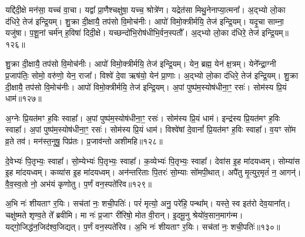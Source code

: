 यद्दि॑दी॒क्षे मन॑सा॒ यच्च॑ वा॒चा।
यद्वा᳚ प्रा॒णैश्चक्षु॑षा॒ यच्च॒ श्रोत्रे॑ण।
यद्रेत॑सा मिथु॒नेनाप्या॒त्मना᳚।
अ॒द्भ्यो लो॒का द॑धिरे॒ तेज॑ इन्द्रि॒यम्।
शु॒क्रा दी॒क्षायै॒ तप॑सो वि॒मोच॑नीः।
आपो॑ विमो॒क्त्रीर्मयि॒ तेज॑ इन्द्रि॒यम्।
यदृ॒चा साम्ना॒ यजु॑षा।
प॒शू॒नां चर्म॑न् ह॒विषा॑ दिदी॒क्षे।
यच्छन्दो॑भि॒रोष॑धीभि॒र्वन॒स्पतौ᳚।
अ॒द्भ्यो लो॒का द॑धिरे॒ तेज॑ इन्द्रि॒यम्॥१२६॥\ip

शु॒क्रा दी॒क्षायै॒ तप॑सो वि॒मोच॑नीः।
आपो॑ विमो॒क्त्रीर्मयि॒ तेज॑ इन्द्रि॒यम्।
येन॒ ब्रह्म॒ येन॑ क्ष॒त्रम्।
येने᳚न्द्रा॒ग्नी प्र॒जा\-प॑तिः॒ सोमो॒ वरु॑णो॒ येन॒ राजा᳚।
विश्वे॑ दे॒वा ऋष॑यो॒ येन॑ प्रा॒णाः।
अ॒द्भ्यो लो॒का द॑धिरे॒ तेज॑ इन्द्रि॒यम्।
शु॒क्रा दी॒क्षायै॒ तप॑सो वि॒मोच॑नीः।
आपो॑ विमो॒क्त्रीर्मयि॒ तेज॑ इन्द्रि॒यम्।
अ॒पां पुष्प॑म॒स्योष॑धीना॒ꣳ॒ रसः॑।
सोम॑स्य प्रि॒यं धाम॑॥१२७॥\ip

अ॒ग्नेः प्रि॒यत॑मꣳ ह॒विः स्वाहा᳚।
अ॒पां पुष्प॑म॒स्योष॑धीना॒ꣳ॒ रसः॑।
सोम॑स्य प्रि॒यं धाम॑।
इन्द्र॑स्य प्रि॒यत॑मꣳ ह॒विः स्वाहा᳚।
अ॒पां पुष्प॑म॒स्योष॑धीना॒ꣳ॒ रसः॑।
सोम॑स्य प्रि॒यं धाम॑।
विश्वे॑षां दे॒वानां᳚ प्रि॒यत॑मꣳ ह॒विः स्वाहा᳚।
व॒यꣳ सो॑म व्र॒ते तव॑।
मन॑स्त॒नूषु॒ पिप्र॑तः।
प्र॒जाव॑न्तो अशीमहि॥१२८॥\ip

दे॒वेभ्यः॑ पि॒तृभ्यः॒ स्वाहा᳚।
सो॒म्येभ्यः॑ पि॒तृभ्यः॒ स्वाहा᳚।
क॒व्येभ्यः॑ पि॒तृभ्यः॒ स्वाहा᳚।
देवा॑स इ॒ह मा॑दयध्वम्।
सोम्या॑स इ॒ह मा॑दयध्वम्।
कव्या॑स इ॒ह मा॑दयध्वम्।
अन॑न्तरिताः पि॒तरः॑ सो॒म्याः सो॑मपी॒थात्।
अपै॑तु मृ॒त्युर॒मृतं॑ न॒ आगन्॑।
वै॒व॒स्व॒तो नो॒ अभ॑यं कृणोतु।
प॒र्णं वन॒स्पते॑रिव॥१२९॥\ip

अ॒भि नः॑ शीयताꣳ र॒यिः।
सच॑तां नः॒ शची॒पतिः॑।
परं॑ मृत्यो॒ अनु॒ परे॑हि॒ पन्था᳚म्।
यस्ते॒ स्व इत॑रो देव॒याना᳚त्।
चक्षु॑ष्मते शृण्व॒ते ते᳚ ब्रवीमि।
मा नः॑ प्र॒जाꣳ री॑रिषो॒ मोत वी॒रान्।
इ॒दमू॒नु श्रेयो॑व॒सान॒माग॑न्म।
यद्गो॒जिद्ध॑न॒जिद॑श्व॒जिद्यत्।
प॒र्णं वन॒स्पते॑रिव।
अ॒भि नः॑ शीयताꣳ र॒यिः।
सच॑तां नः॒ शची॒पतिः॑॥१३०॥\ip\anuvakamend[वन॒स्पता॑व॒द्भ्यो लो॒का द॑धिरे॒ तेज॑ इन्द्रि॒यं धामा॑शीमहीवा॒भिनः॑ शीयताꣳ र॒यिरेकं॑ च]


\setcounter{anuvakam}{0}

